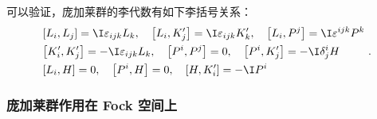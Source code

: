 可以验证，庞加莱群的李代数有如下李括号关系：
\begin{equation}
\begin{aligned}
& {\left[L_i, L_j\right]=\I \varepsilon_{i j k} L_k, \quad\left[L_i, K'_j\right]=\I \varepsilon_{i j k} K'_k, \quad\left[L_i, P^j\right]=\I \varepsilon^{i j k} P^k} \\
& {\left[K'_i, K'_j\right]=-\I \varepsilon_{i j k} L_k, \quad\left[P^i, P^j\right]=0, \quad\left[P^i, K'_j\right]=-\I \delta^i_j H} \\
& {\left[L_i, H\right]=0, \quad\left[P^i, H\right]=0, \quad\left[H, K'_i\right]=-\I P^i}
\end{aligned}~.
\end{equation}

\subsubsection{庞加莱群作用在 Fock 空间上}
